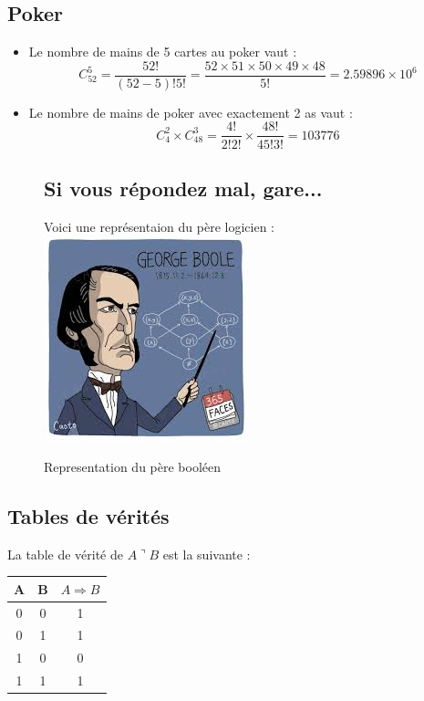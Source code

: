 \documentclass[a4]{article}
\begin{document}
\subsection{Poker}
\begin{itemize}
\item Le nombre de mains de 5 cartes au poker vaut : 
\[C^{5}_{52}= \frac{52!}{(52-5)!5!}=\frac{52 \times 51 \times 50 \times 49 \times 48}{5!}=2.59896 \times 10^{6}\]
\item Le nombre de mains de poker avec exactement 2 as vaut :
\[C^{2}_{4} \times C^{3}_{48}= \frac{4!}{2!2!} \times \frac{48!}{45!3!} =103776\]
\end{itemize}
\begin{figure}[h]
\subsection{Si vous répondez mal, gare...}
Voici une représentaion du père logicien :\\
\centering
\includegraphics[scale=0.5]{boole.jpg}
\label{figure 1}
\caption{Representation du père booléen}
\end{figure}
\subsection{Tables de vérités}
La table de vérité de $A \urcorner B$ est la suivante :
\vspace {0,5cm}

\begin{tabular}[h]{|c|c||c|}
\hline
A & B & $A \Rightarrow B$\\
\hline
\hline
0 & 0 & 1\\
\hline
0 & 1 & 1\\
\hline
1 & 0 & 0\\
\hline
1 & 1 & 1\\
\hline
\end{tabular}
\vspace{0,5cm}
\end{document}

